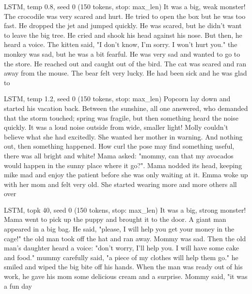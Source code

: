 \begin{modelout}{LSTM, temp 0.8, seed 0 (150 tokens, stop: max\_len)}
\small It was a big, weak monster! The crocodile was very scared and hurt. He tried to open the box but he was too fast. He dropped the jet and jumped quickly. He was scared, but he didn't want to leave the big tree. He cried and shook his head against his nose. But then, he heard a voice. The kitten said, "I don't know, I'm sorry. I won't hurt you." the monkey was sad, but he was a bit fearful. He was very sad and wanted to go to the store. He reached out and caught out of the bird. The cat was scared and ran away from the mouse. The bear felt very lucky. He had been sick and he was glad to
\end{modelout}

\begin{modelout}{LSTM, temp 1.2, seed 0 (150 tokens, stop: max\_len)}
\small Popcorn lay down and started his vacation back. Between the sunshine, all one answered, who demanded that the storm touched; spring was fragile, but then something heard the noise quickly. It was a loud noise outside from wide, smaller light! Molly couldn't believe what she had excitedly. She wanted her mother in warning. And nothing out, then something happened. How curl the pose may find something useful, there was all bright and white! Mama asked: "mommy, can that my avocados would happen in the sunny place where it go?". Mama nodded its head, keeping mike mad and enjoy the patient before she was only waiting at it. Emma woke up with her mom and felt very old. She started wearing more and more others all over
\end{modelout}

\begin{modelout}{LSTM, topk 40, seed 0 (150 tokens, stop: max\_len)}
\small It was a big, strong monster! Mama went to pick up the puppy and brought it to the door. A giant man appeared in a big bag. He said, "please, I will help you get your money in the cage!" the old man took off the hat and ran away. Mommy was sad. Then the old man's daughter heard a voice: "don't worry, I'll help you. I will have some cake and food." mummy carefully said, "a piece of my clothes will help them go." he smiled and wiped the big bite off his hands. When the man was ready out of his work, he gave his mom some delicious cream and a surprise. Mommy said, "it was a fun day
\end{modelout}

